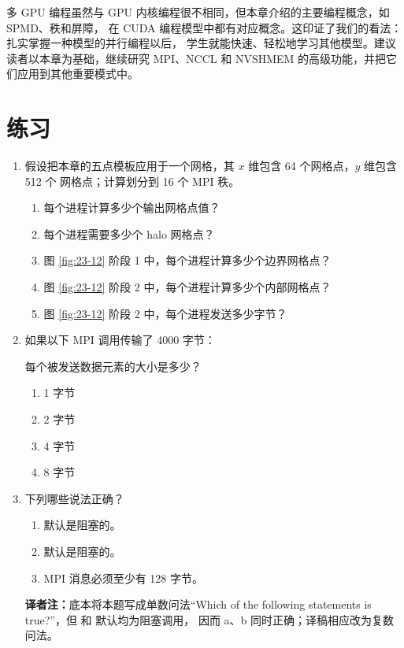 多 GPU 编程虽然与 GPU 内核编程很不相同，但本章介绍的主要编程概念，如 SPMD、秩和屏障，
在 CUDA 编程模型中都有对应概念。这印证了我们的看法：扎实掌握一种模型的并行编程以后，
学生就能快速、轻松地学习其他模型。建议读者以本章为基础，继续研究 MPI、NCCL 和 NVSHMEM
的高级功能，并把它们应用到其他重要模式中。

\section{练习}
\label{sec:multi-gpu-exercises}

\begin{enumerate}[label=\arabic*.,leftmargin=2.7em]
  \item 假设把本章的五点模板应用于一个网格，其 $x$ 维包含 64 个网格点，$y$ 维包含 512 个
  网格点；计算划分到 16 个 MPI 秩。
  \begin{enumerate}[label=\alph*.,leftmargin=2.2em]
    \item 每个进程计算多少个输出网格点值？
    \item 每个进程需要多少个 halo 网格点？
    \item 图 \ref{fig:23-12} 阶段 1 中，每个进程计算多少个边界网格点？
    \item 图 \ref{fig:23-12} 阶段 2 中，每个进程计算多少个内部网格点？
    \item 图 \ref{fig:23-12} 阶段 2 中，每个进程发送多少字节？
  \end{enumerate}

  \item 如果以下 MPI 调用传输了 4000 字节：
  \begin{center}
    \small{}
  \end{center}
  每个被发送数据元素的大小是多少？
  \begin{enumerate}[label=\alph*.,leftmargin=2.2em]
    \item 1 字节
    \item 2 字节
    \item 4 字节
    \item 8 字节
  \end{enumerate}

  \item 下列哪些说法正确？
  \begin{enumerate}[label=\alph*.,leftmargin=2.2em]
    \item {} 默认是阻塞的。
    \item {} 默认是阻塞的。
    \item MPI 消息必须至少有 128 字节。
  \end{enumerate}
  \par\noindent\textbf{译者注：}底本将本题写成单数问法“Which of the following
  statements is true?”，但  和  默认均为阻塞调用，
  因而 a、b 同时正确；译稿相应改为复数问法。
\end{enumerate}

